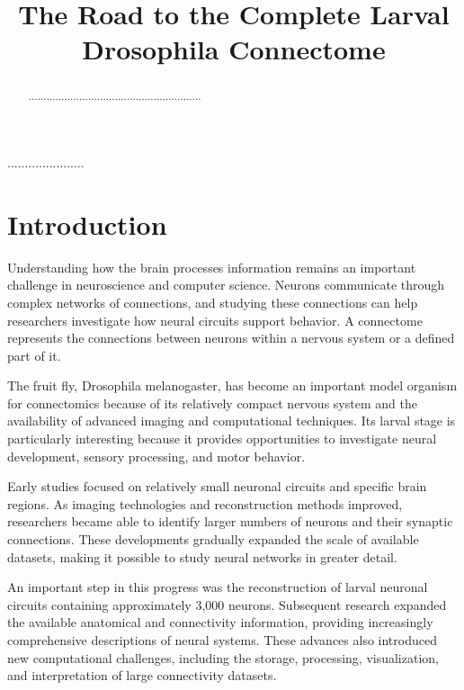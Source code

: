 \documentclass[conference]{IEEEtran}
\begin{document}
\title{The Road to the Complete Larval Drosophila Connectome}

\author{
}

\maketitle

\begin{abstract}
..........................................................
\end{abstract}

\begin{IEEEkeywords}
......................
\end{IEEEkeywords}

\section{Introduction}

Understanding how the brain processes information remains an important
challenge in neuroscience and computer science. Neurons communicate
through complex networks of connections, and studying these connections
can help researchers investigate how neural circuits support behavior.
A connectome represents the connections between neurons within a nervous
system or a defined part of it.

The fruit fly, Drosophila melanogaster, has become an important
model organism for connectomics because of its relatively compact nervous
system and the availability of advanced imaging and computational
techniques. Its larval stage is particularly interesting because it
provides opportunities to investigate neural development, sensory
processing, and motor behavior.

Early studies focused on relatively small neuronal circuits and
specific brain regions. As imaging technologies and reconstruction
methods improved, researchers became able to identify larger numbers
of neurons and their synaptic connections. These developments gradually
expanded the scale of available datasets, making it possible to study
neural networks in greater detail.

An important step in this progress was the reconstruction of larval
neuronal circuits containing approximately 3,000 neurons. Subsequent
research expanded the available anatomical and connectivity information,
providing increasingly comprehensive descriptions of neural systems.
These advances also introduced new computational challenges, including
the storage, processing, visualization, and interpretation of large
connectivity datasets.
\end{document}
